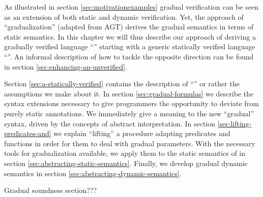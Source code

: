 As illustrated in section \ref{sec:motivationexamples} gradual verification can be seen as an extension of both static and dynamic verification.
Yet, the approach of “gradualization” (adapted from AGT) derives the gradual semantics in terms of static semantics.
In this chapter we will thus describe our approach of deriving a gradually verified language “\gvl” starting with a generic statically verified language “\svl”.
An informal description of how to tackle the opposite direction can be found in section \ref{sec:enhancing-an-unverified}.

Section \ref{sec:a-statically-verified} contains the description of “\svl” or rather the assumptions we make about it.
In section \ref{sec:gradual-formulas} we describe the syntax extensions necessary to give programmers the opportunity to deviate from purely static annotations.
We immediately give a meaning to the new “gradual” syntax, driven by the concepts of abstract interpretation.
In section \ref{sec:lifting-predicates-and} we explain “lifting” a procedure adapting predicates and functions in order for them to deal with gradual parameters.
With the necessary tools for gradualization available, we apply them to the static semantics of \svl in section \ref{sec:abstracting-static-semantics}.
Finally, we develop gradual dynamic semantics in section \ref{sec:abstracting-dynamic-semantics}.

Gradual soundness section???


